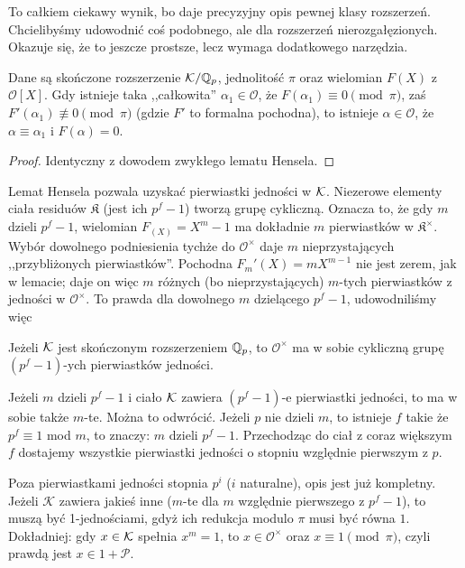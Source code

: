 To całkiem ciekawy wynik, bo daje precyzyjny opis pewnej klasy rozszerzeń.
Chcielibyśmy udowodnić coś podobnego, ale dla rozszerzeń nierozgałęzionych.
Okazuje się, że to jeszcze prostsze, lecz wymaga dodatkowego narzędzia.

\begin{twierdzenie}
	Dane są skończone rozszerzenie $\mathcal K/\mathbb Q_p$, jednolitość $\pi$ oraz wielomian $F(X)$ z $\mathcal O[X]$.
	Gdy istnieje taka ,,całkowita'' $\alpha_1 \in \mathcal O$, że $F(\alpha_1) \equiv 0 \pmod \pi$, zaś $F'(\alpha_1) \not\equiv 0 \pmod \pi$ (gdzie $F'$ to formalna pochodna), to istnieje $\alpha \in \mathcal O$, że $\alpha \equiv \alpha_1$ i $F(\alpha) = 0$.
\end{twierdzenie}

\begin{proof}
	Identyczny z dowodem zwykłego lematu Hensela.
\end{proof}

Lemat Hensela pozwala uzyskać pierwiastki jedności w $\mathcal K$.
Niezerowe elementy ciała residuów $\mathfrak K$ (jest ich $p^f -1$) tworzą grupę cykliczną.
Oznacza to, że gdy $m$ dzieli $p^f-1$, wielomian $F_(X) = X^m-1$ ma dokładnie $m$ pierwiastków w $\mathfrak K^\times$.
Wybór dowolnego podniesienia tychże do $\mathcal O^\times$ daje $m$ nieprzystających ,,przybliżonych pierwiastków''.
Pochodna $F_m'(X) = mX^{m-1}$ nie jest zerem, jak w lemacie; daje on więc $m$ różnych (bo nieprzystających) $m$-tych pierwiastków z jedności w $\mathcal O^\times$.
To prawda dla dowolnego $m$ dzielącego $p^f-1$, udowodniliśmy więc

\begin{fakt} \label{vergisst}
	Jeżeli $\mathcal K$ jest skończonym rozszerzeniem $\mathbb Q_p$, to $\mathcal O^\times$ ma w sobie cykliczną grupę $(p^f-1)$-ych pierwiastków jedności.
\end{fakt}

Jeżeli $m$ dzieli $p^f-1$ i ciało $\mathcal K$ zawiera $(p^f-1)$-e pierwiastki jedności, to ma w sobie także $m$-te.
Można to odwrócić.
Jeżeli $p$ nie dzieli $m$, to istnieje $f$ takie że $p^f \equiv 1$ mod $m$, to znaczy: $m$ dzieli $p^f-1$.
Przechodząc do ciał z coraz większym $f$ dostajemy wszystkie pierwiastki jedności o stopniu względnie pierwszym z $p$.

Poza pierwiastkami jedności stopnia $p^i$ ($i$ naturalne), opis jest już kompletny.
Jeżeli $\mathcal K$ zawiera jakieś inne ($m$-te dla $m$ względnie pierwszego z $p^f-1$), to muszą być 1-jednościami, gdyż ich redukcja modulo $\pi$ musi być równa $1$.
Dokładniej: gdy $x \in \mathcal K$ spełnia $x^m = 1$, to $x \in \mathcal O^\times$ oraz $x \equiv 1 \pmod \pi$, czyli prawdą jest $x \in 1 + \mathcal P$.

